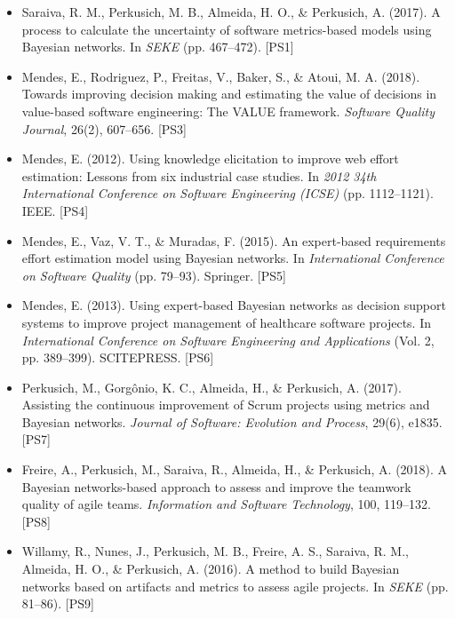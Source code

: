\small
\begin{itemize}

\item Saraiva, R. M., Perkusich, M. B., Almeida, H. O., \& Perkusich, A. (2017).
A process to calculate the uncertainty of software metrics-based models using Bayesian networks.
In \textit{SEKE} (pp. 467--472). [PS1]

\item Mendes, E., Rodriguez, P., Freitas, V., Baker, S., \& Atoui, M. A. (2018).
Towards improving decision making and estimating the value of decisions in value-based software engineering: The VALUE framework.
\textit{Software Quality Journal}, 26(2), 607--656. [PS3]

\item Mendes, E. (2012).
Using knowledge elicitation to improve web effort estimation: Lessons from six industrial case studies.
In \textit{2012 34th International Conference on Software Engineering (ICSE)} (pp. 1112--1121). IEEE. [PS4]

\item Mendes, E., Vaz, V. T., \& Muradas, F. (2015).
An expert-based requirements effort estimation model using Bayesian networks.
In \textit{International Conference on Software Quality} (pp. 79--93). Springer. [PS5]

\item Mendes, E. (2013).
Using expert-based Bayesian networks as decision support systems to improve project management of healthcare software projects.
In \textit{International Conference on Software Engineering and Applications} (Vol. 2, pp. 389--399). SCITEPRESS. [PS6]

\item Perkusich, M., Gorgônio, K. C., Almeida, H., \& Perkusich, A. (2017).
Assisting the continuous improvement of Scrum projects using metrics and Bayesian networks.
\textit{Journal of Software: Evolution and Process}, 29(6), e1835. [PS7]

\item Freire, A., Perkusich, M., Saraiva, R., Almeida, H., \& Perkusich, A. (2018).
A Bayesian networks-based approach to assess and improve the teamwork quality of agile teams.
\textit{Information and Software Technology}, 100, 119--132. [PS8]

\item Willamy, R., Nunes, J., Perkusich, M. B., Freire, A. S., Saraiva, R. M., Almeida, H. O., \& Perkusich, A. (2016).
A method to build Bayesian networks based on artifacts and metrics to assess agile projects.
In \textit{SEKE} (pp. 81--86). [PS9]


\end{itemize}
